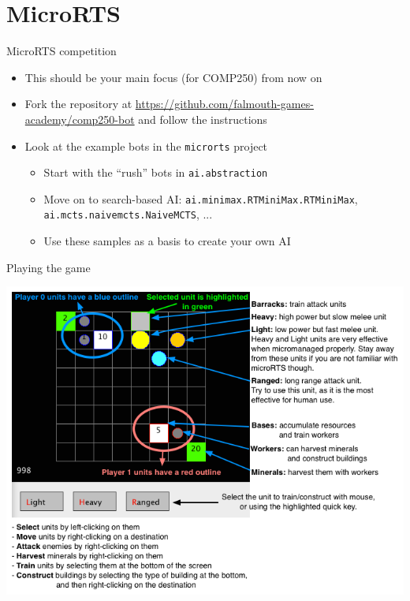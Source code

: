 \part{MicroRTS}
\frame{\partpage}

\begin{frame}{MicroRTS competition}
	\begin{itemize}
		\pause\item This should be your main focus (for COMP250) from now on
		\pause\item Fork the repository at \url{https://github.com/falmouth-games-academy/comp250-bot}
			and follow the instructions
		\pause\item Look at the example bots in the \texttt{microrts} project
			\begin{itemize}
				\pause\item Start with the ``rush'' bots in \texttt{ai.abstraction}
				\pause\item Move on to search-based AI: \texttt{ai.minimax.RTMiniMax.RTMiniMax},
					\texttt{ai.mcts.naivemcts.NaiveMCTS}, ...
				\pause\item Use these samples as a basis to create your own AI
			\end{itemize}
	\end{itemize}
\end{frame}

\begin{frame}{Playing the game}
    \begin{center}
        \includegraphics[height=0.8\textheight]{microrts_game}
    \end{center}
\end{frame}

